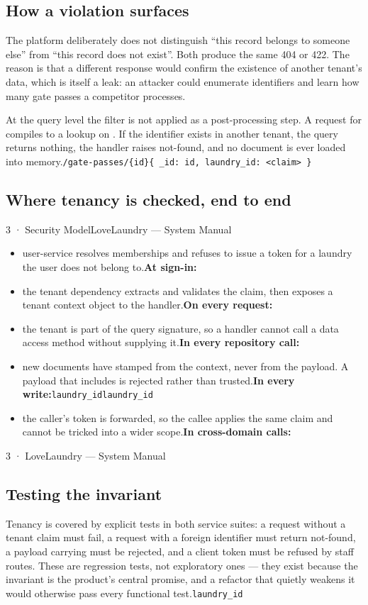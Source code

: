 \documentclass[11pt,a4paper,oneside]{book}
\begin{document}
\subsection*{How a violation surfaces}
The platform deliberately does not distinguish “this record belongs to someone else” from “this record does not exist”. Both produce the same 404 or 422. The reason is that a different response would confirm the existence of another tenant's data, which is itself a leak: an attacker could enumerate identifiers and learn how many gate passes a competitor processes.

At the query level the filter is not applied as a post-processing step. A request for  compiles to a lookup on . If the identifier exists in another tenant, the query returns nothing, the handler raises not-found, and no document is ever loaded into memory.\texttt{/gate-passes/\{id\}}\texttt{\{ \_id: id, laundry\_id: <claim> \}}

\subsection*{Where tenancy is checked, end to end}
3 · Security ModelLoveLaundry — System Manual

\begin{itemize}
\item user-service resolves memberships and refuses to issue a token for a laundry the user does not belong to.\textbf{At sign-in:}
\item the tenant dependency extracts and validates the claim, then exposes a tenant context object to the handler.\textbf{On every request:}
\item the tenant is part of the query signature, so a handler cannot call a data access method without supplying it.\textbf{In every repository call:}
\item new documents have  stamped from the context, never from the payload. A payload that includes  is rejected rather than trusted.\textbf{In every write:}\texttt{laundry\_id}\texttt{laundry\_id}
\item the caller's token is forwarded, so the callee applies the same claim and cannot be tricked into a wider scope.\textbf{In cross-domain calls:}
\end{itemize}
3 · LoveLaundry — System Manual

\subsection*{Testing the invariant}
Tenancy is covered by explicit tests in both service suites: a request without a tenant claim must fail, a request with a foreign identifier must return not-found, a payload carrying  must be rejected, and a client token must be refused by staff routes. These are regression tests, not exploratory ones — they exist because the invariant is the product's central promise, and a refactor that quietly weakens it would otherwise pass every functional test.\texttt{laundry\_id}
\end{document}
